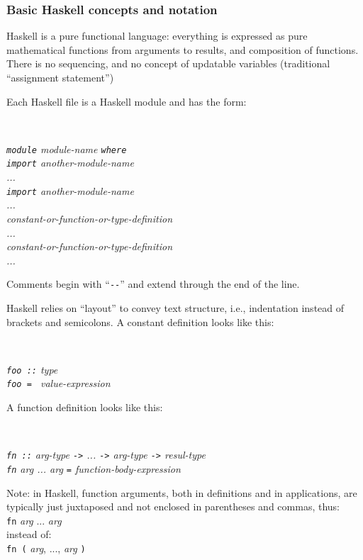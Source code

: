 \documentclass[11pt]{article}
\newcommand{\hmmmm}{\hspace*{4em}}
\begin{document}
\subsubsection{Basic Haskell concepts and notation}

Haskell is a pure functional language: everything is expressed as pure
mathematical functions from arguments to results, and composition of
functions.  There is no sequencing, and no concept of updatable
variables (traditional ``assignment statement'')

Each Haskell file is a Haskell module and has the form:

\hmmmm \
\begin{minipage}[t]{4in}\it
{\tt module} module-name {\tt where} \\
{\tt import} another-module-name \\
... \\
{\tt import} another-module-name \\
... \\
constant-or-function-or-type-definition \\
... \\
constant-or-function-or-type-definition \\
...
\end{minipage}

Comments begin with ``\verb|--|'' and extend through the end of the line.

Haskell relies on ``layout'' to convey text structure, i.e.,
indentation instead of brackets and semicolons. A constant definition
looks like this:

\hmmmm \
\begin{minipage}[t]{4in}\it
{\tt foo ::} type \\
{\tt foo = } value-expression
\end{minipage}

A function definition looks like this:

\hmmmm \
\begin{minipage}[t]{4in}\it
{\tt fn ::} arg-type {\tt ->} ... {\tt ->} arg-type {\tt ->} resul-type \\
{\tt fn} arg ... arg {\tt  =} function-body-expression
\end{minipage}

Note: in Haskell, function arguments, both in definitions
and in applications, are typically just juxtaposed and not enclosed in
parentheses and commas, thus: \\
\hspace*{2in} {\tt fn} \emph{arg} ... \emph{arg} \\
instead of: \\
\hspace*{2in} {\tt fn (} \emph{arg}, ..., \emph{arg} {\tt )}
\end{document}
